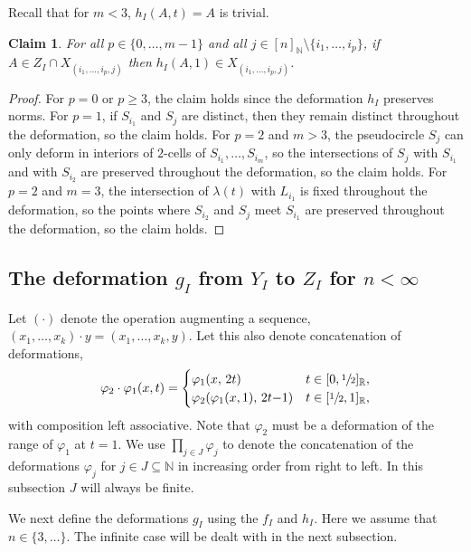 \documentclass[11pt]{article}
\numberwithin{equation}{section}
\let\nicefrac\sfrac
\newtheorem{claim}[theorem]{Claim}
\theoremstyle{remark}
\let\mb\mathbb
\let\phi\varphi
\begin{document}
Recall that for $m < 3$, $h_I(A,t) = A$ is trivial.

\begin{claim}\label{claim-stable-h}
For all $p \in \{0,\dots,m{-}1\}$ and all $j \in [n]_\mb{N} \setminus \{i_1,\dots,i_p\}$,
if $A \in Z_I \cap X_{(i_1,\dots,i_{p},j)}$ then $h_I(A,1) \in X_{(i_1,\dots,i_{p},j)}$.
\end{claim}

\begin{proof}
For $p = 0$ or $p \geq 3$, the claim holds since the deformation $h_I$ preserves norms.
For $p = 1$, if $S_{i_1}$ and $S_j$ are distinct, then they remain distinct throughout the deformation, so the claim holds.
For $p = 2$ and $m > 3$, the pseudocircle $S_j$ can only deform in interiors of $2$-cells of $S_{i_1},\dots,S_{i_m}$, so the intersections of $S_j$ with $S_{i_1}$ and with $S_{i_2}$ are preserved throughout the deformation, so the claim holds.
For $p = 2$ and $m = 3$, the intersection of $\lambda(t)$ with $L_{i_1}$ is fixed throughout the deformation, so the points where $S_{i_2}$ and $S_j$ meet $S_{i_1}$ are preserved throughout the deformation, so the claim holds.
\end{proof}

\subsection{The deformation $g_I$ from $Y_I$ to $Z_I$ for $n < \infty$}
\label{subsubsec-g-finite}

Let $(\cdot)$ denote the operation augmenting a sequence, $(x_1, \dots, x_k) \cdot y = (x_1, \dots, x_k, y)$.
Let this also denote concatenation of deformations,
\[\phi_2 \cdot \phi_1 (x,t) =
\begin{cases}
\phi_1(x,\, 2t) & t \in [0, \nicefrac{1}{2}]_\mb{R}, \\
\phi_2(\phi_1(x,1),\, 2t{-}1) & t \in [\nicefrac{1}{2},1]_\mb{R}, \\
\end{cases}
\]
with composition left associative. Note that $\phi_2$ must be a deformation of the range of $\phi_1$ at $t=1$.
We use $\prod_{j \in J} \phi_j$ to denote the concatenation of the deformations $\phi_j$ for $j \in J \subseteq \mb{N}$ in increasing order from right to left.
In this subsection $J$ will always be finite.

We next define the deformations $g_I$ using the $f_I$ and $h_I$.
Here we assume that $n \in \{3,\dots\}$. The infinite case will be dealt with in the next subsection.
\end{document}
